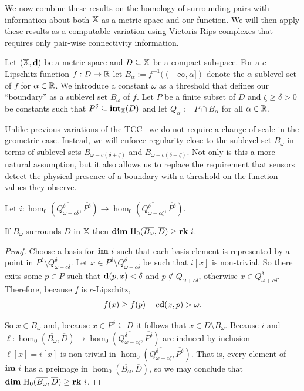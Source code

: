 
We now combine these results on the homology of surrounding pairs with information about both $\mathbb{X}$ as a metric space and our function.
We will then apply these results as a computable variation using Vietoris-Rips complexes that requires only pair-wise connectivity information.

Let $(\mathbb{X},\mathbf{d})$ be a metric space and $D\subseteq \mathbb{X}$ be a compact subspace.
For a $c$-Lipschitz function $f : D\to \mathbb{R}$ let $B_\alpha := f^{-1}((-\infty, \alpha])$ denote the $\alpha$ sublevel set of $f$ for $\alpha\in\mathbb{R}$.
We introduce a constant $\omega$ as a threshold that defines our ``boundary'' as a sublevel set $B_\omega$ of $f$.
Let $P$ be a finite subset of $D$ and $\zeta\geq\delta > 0 $ be constants such that $P^\delta\subseteq \mathbf{int}_{\mathbb{X}}(D)$ and let $Q_\alpha := P\cap B_\alpha$ for all $\alpha\in\mathbb{R}$.

Unlike previous variations of the TCC~\cite{cavanna2017when} we do not require a change of scale in the geometric case.
Instead, we will enforce regularity close to the sublevel set $B_\omega$ in terms of sublevel sets $B_{\omega-c(\delta+\zeta)}$ and $B_{\omega+c(\delta+\zeta)}$.
Not only is this a more natural assumption, but it also allows us to replace the requirement that sensors detect the physical presence of a boundary with a threshold on the function values they observe.


\begin{lemma}\label{lem:psurj}
  Let $i : \hom_0(\overline{Q_{\omega+c\delta}^\delta}, \overline{P^\delta})\to \hom_0(\overline{Q_{\omega-c\zeta}^\delta}, \overline{P^\delta})$.

  If $B_\omega$ surrounds $D$ in $\mathbb{X}$ then $\mathbf{dim}~\mathrm{H}_0(\overline{B_\omega}, \overline{D})\geq \mathbf{rk}~i$.
\end{lemma}
\begin{proof}
  Choose a basis for $\mathbf{im}~i$ such that each basis element is represented by a point in $P^\delta\setminus Q_{\omega+c\delta}^\delta$.
  Let $x\in P^\delta\setminus Q_{\omega+c\delta}^\delta$ be such that $i[x]$ is non-trivial.
  So there exits some $p\in P$ such that $\mathbf{d}(p, x) < \delta$ and $p\notin Q_{\omega+c\delta}$, otherwise $x\in Q_{\omega+c\delta}^\delta$.
  Therefore, because $f$ is $c$-Lipschitz,
  \[ f(x)\geq f(p) - c\mathbf{d}(x, p) > \omega.\]

  So $x\in\overline{B_\omega}$ and, because $x\in P^\delta\subseteq D$ it follows that $x\in D\setminus B_\omega$.
  Because $i$ and $\ell : \hom_0(\overline{B_\omega}, \overline{D})\to \hom_0(\overline{Q_{\omega-c\zeta}^\delta}, \overline{P^\delta})$ are induced by inclusion $\ell[x] = i[x]$ is non-trivial in $\hom_0(\overline{Q_{\omega-c\zeta}^\delta}, \overline{P^\delta})$.
  That is, every element of $\mathbf{im}~i$ has a preimage in $\hom_0(\overline{B_\omega}, \overline{D})$, so we may conclude that $\mathbf{dim}~\mathrm{H}_0(\overline{B_\omega}, \overline{D})\geq \mathbf{rk}~i$.
\end{proof}

